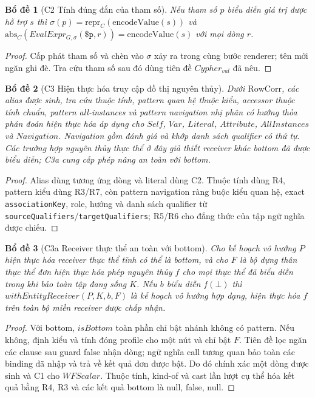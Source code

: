 \documentclass[11pt,a4paper]{article}
\newtheorem{lemma}{Bổ đề}
\theoremstyle{definition}
\newcommand{\encodeValue}{\mathrm{encodeValue}}
\newcommand{\RowCorr}{\mathrm{RowCorr}}
\newcommand{\reprC}{\mathrm{repr}_{C}}
\newcommand{\absC}{\mathrm{abs}_{C}}
\begin{document}
\begin{lemma}[C2 Tính đúng đắn của tham số]
Nếu tham số $p$ biểu diễn giá trị được hỗ trợ $s$ thì
$\sigma(p)=\reprC(\encodeValue(s))$ và
$\absC(EvalExpr_{G,\sigma}(\texttt{\$p},r))=\encodeValue(s)$ với mọi dòng $r$.
\end{lemma}
\begin{proof}
Cấp phát tham số và chèn vào $\sigma$ xảy ra trong cùng bước renderer; tên mới
ngăn ghi đè. Tra cứu tham số sau đó dùng tiên đề $Cypher_{val}$ đã nêu.
\end{proof}

\begin{lemma}[C3 Hiện thực hóa truy cập đồ thị nguyên thủy]
Dưới $\RowCorr$, các alias được sinh, tra cứu thuộc tính, pattern quan hệ thuộc
kiểu, accessor thuộc tính chuẩn, pattern all-instances và pattern navigation
nhị phân có hướng thỏa phán đoán hiện thực hóa áp dụng cho $Self$, $Var$,
$Literal$, $Attribute$, $AllInstances$ và $Navigation$. Navigation gồm đánh
giá và khớp danh sách qualifier có thứ tự. Các trường hợp nguyên thủy thực thể
ở đây giả thiết receiver khác bottom đã được biểu diễn; C3a cung cấp phép nâng
an toàn với bottom.
\end{lemma}
\begin{proof}
Alias dùng tương ứng dòng và literal dùng C2. Thuộc tính dùng R4, pattern kiểu
dùng R3/R7, còn pattern navigation ràng buộc kiểu quan hệ,
exact \texttt{associationKey}, role, hướng và danh sách qualifier từ
\texttt{sourceQualifiers}/\texttt{targetQualifiers}; R5/R6
cho đẳng thức của tập ngữ nghĩa được chiếu.
\end{proof}

\begin{lemma}[C3a Receiver thực thể an toàn với bottom]
Cho kế hoạch vô hướng $P$ hiện thực hóa receiver thực thể tĩnh có thể là bottom,
và cho $F$ là bộ dựng thân thực thể đơn hiện thực hóa phép nguyên thủy $f$ cho
mọi thực thể đã biểu diễn trong khi bảo toàn tập đang sống $K$. Nếu $b$ biểu
diễn $f(\bot)$ thì $withEntityReceiver(P,K,b,F)$ là kế hoạch vô hướng hợp
dạng, hiện thực hóa $f$ trên toàn bộ miền receiver được chấp nhận.
\end{lemma}
\begin{proof}
Với bottom, $isBottom$ toàn phần chỉ bật nhánh không có pattern. Nếu không,
định kiểu và tính đóng profile cho một nút và chỉ bật $F$. Tiên đề lọc ngăn các
clause sau guard false nhận dòng; ngữ nghĩa call tương quan bảo toàn các binding
đã nhập và trả về kết quả đơn được bật. Do đó chính xác một dòng được sinh và
C1 cho $WFScalar$. Thuộc tính, kind-of và cast lần lượt cụ thể hóa kết quả bằng
R4, R3 và các kết quả bottom là null, false, null.
\end{proof}
\end{document}
